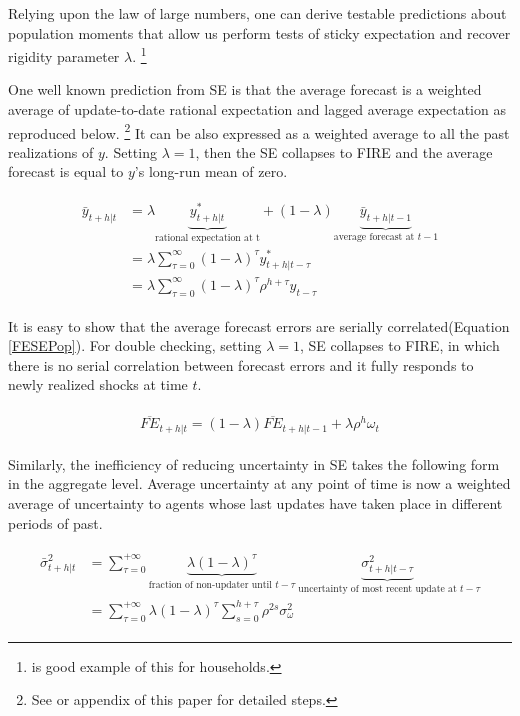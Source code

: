 \documentclass[]{article}
\begin{document}
	Relying upon the law of large numbers, one can derive testable predictions about population moments that allow us perform tests of sticky expectation and recover rigidity parameter $\lambda$. \footnote{\citet{carroll2003macroeconomic} is good example of this for households.} 
	
	One well known prediction from SE is that the average forecast is a weighted average of update-to-date rational expectation and lagged average expectation as reproduced below. \footnote{See \citet{coibion2012can} or appendix of this paper for detailed steps.} It can be also expressed as a weighted average to all the past realizations of $y$. Setting $\lambda=1$, then the SE collapses to FIRE and the average forecast is equal to $y$'s long-run mean of zero.
	
	\begin{eqnarray}\label{MeanSEPop}
		\begin{aligned}
			\bar y_{t+h|t} & = \lambda \underbrace{y^*_{t+h|t}}_{\textrm{rational expectation at t}} + (1-\lambda) \underbrace{\bar y_{t+h|t-1}}_{\textrm{average forecast at } t-1} \\
			& = \lambda \sum^{\infty}_{\tau=0} (1-\lambda)^\tau y^*_{t+h|t-\tau} \\
			& = \lambda \sum^{\infty}_{\tau=0} (1-\lambda)^\tau \rho^{h+\tau}y_{t-\tau}
		\end{aligned}
	\end{eqnarray}
	
	It is easy to show that the average forecast errors are serially correlated(Equation \ref{FESEPop}). For double checking, setting $\lambda=1$, SE collapses to FIRE, in which there is no serial correlation between forecast errors and it fully responds to newly realized shocks at time $t$.  
	
	\begin{eqnarray}\label{FESEPop}
		\begin{aligned}
			\overline{FE}_{t+h|t}  = (1-\lambda) \overline {FE}_{t+h|t-1} + \lambda \rho^h \omega_t 
		\end{aligned}
	\end{eqnarray}
	
	Similarly, the inefficiency of reducing uncertainty in SE takes the following form in the aggregate level. Average uncertainty at any point of time is now a weighted average of uncertainty to agents whose last updates have taken place in different periods of past. 
	
	
	\begin{eqnarray}\label{VarSEPop}
		\begin{aligned}
			\bar \sigma^2_{t+h|t} & = \sum^{+\infty}_{\tau =0} \underbrace{\lambda (1-\lambda)^\tau}_{\text{fraction of non-updater until }t-\tau} \underbrace{\sigma^2_{t+h|t-\tau}}_{\text{ uncertainty of most recent update at }t-\tau} \\
			& = \sum^{+\infty}_{\tau =0} \lambda (1-\lambda)^\tau \sum^{h+\tau}_{s=0}\rho^{2s} \sigma^2_{\omega}
		\end{aligned}
	\end{eqnarray}
	
\end{document}
